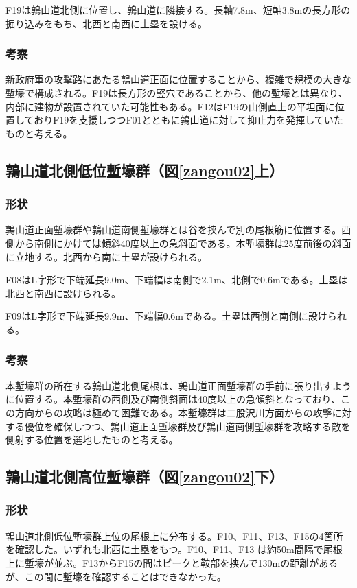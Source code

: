 \documentclass[11pt,report]{jsarticle}
\begin{document}
F19は鶉山道北側に位置し、鶉山道に隣接する。長軸7.8m、短軸3.8mの長方形の掘り込みをもち、北西と南西に土塁を設ける。

\subsubsection*{考察}
新政府軍の攻撃路にあたる鶉山道正面に位置することから、複雑で規模の大きな塹壕で構成される。F19は長方形の竪穴であることから、他の塹壕とは異なり、内部に建物が設置されていた可能性もある。F12はF19の山側直上の平坦面に位置しておりF19を支援しつつF01とともに鶉山道に対して抑止力を発揮していたものと考える。

\subsection{鶉山道北側低位塹壕群（図\ref{zangou02}上）}
\subsubsection*{形状}
鶉山道正面塹壕群や鶉山道南側塹壕群とは谷を挟んで別の尾根筋に位置する。西側から南側にかけては傾斜40度以上の急斜面である。本塹壕群は25度前後の斜面に立地する。北西から南に土塁が設けられる。

F08はL字形で下端延長9.0m、下端幅は南側で2.1m、北側で0.6mである。土塁は北西と南西に設けられる。

F09はL字形で下端延長9.9m、下端幅0.6mである。土塁は西側と南側に設けられる。

\subsubsection*{考察}
本塹壕群の所在する鶉山道北側尾根は、鶉山道正面塹壕群の手前に張り出すように位置する。本塹壕群の西側及び南側斜面は40度以上の急傾斜となっており、この方向からの攻略は極めて困難である。本塹壕群は二股沢川方面からの攻撃に対する優位を確保しつつ、鶉山道正面塹壕群及び鶉山道南側塹壕群を攻略する敵を側射する位置を選地したものと考える。

\subsection{鶉山道北側高位塹壕群（図\ref{zangou02}下）}
\subsubsection*{形状}
鶉山道北側低位塹壕群上位の尾根上に分布する。F10、F11、F13、F15の4箇所を確認した。いずれも北西に土塁をもつ。F10、F11、F13 は約50m間隔で尾根上に塹壕が並ぶ。F13からF15の間はピークと鞍部を挟んで130mの距離があるが、この間に塹壕を確認することはできなかった。
\end{document}
